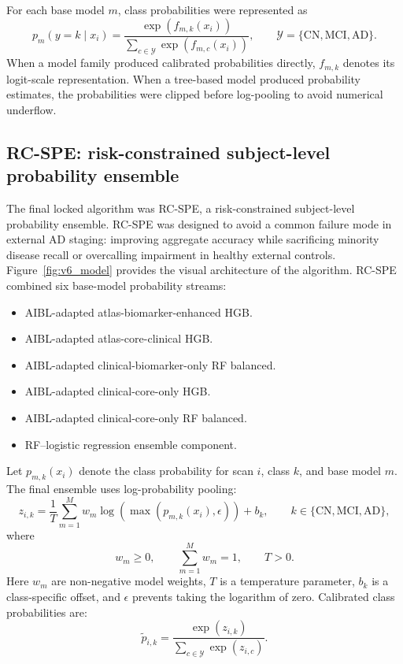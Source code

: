 For each base model $m$, class probabilities were represented as
\begin{equation}
p_m(y=k\mid x_i)=
\frac{\exp(f_{m,k}(x_i))}
{\sum_{c\in\mathcal{Y}}\exp(f_{m,c}(x_i))},
\qquad
\mathcal{Y}=\{\mathrm{CN},\mathrm{MCI},\mathrm{AD}\}.
\label{eq:base_prob}
\end{equation}
When a model family produced calibrated probabilities directly, $f_{m,k}$ denotes its logit-scale representation. When a tree-based model produced probability estimates, the probabilities were clipped before log-pooling to avoid numerical underflow.

\subsection{RC-SPE: risk-constrained subject-level probability ensemble}
\label{sec:model}

The final locked algorithm was RC-SPE, a risk-constrained subject-level probability ensemble. RC-SPE was designed to avoid a common failure mode in external AD staging: improving aggregate accuracy while sacrificing minority disease recall or overcalling impairment in healthy external controls. Figure~\ref{fig:v6_model} provides the visual architecture of the algorithm. RC-SPE combined six base-model probability streams:
\begin{itemize}[leftmargin=*,itemsep=2pt]
    \item AIBL-adapted atlas-biomarker-enhanced HGB.
    \item AIBL-adapted atlas-core-clinical HGB.
    \item AIBL-adapted clinical-biomarker-only RF balanced.
    \item AIBL-adapted clinical-core-only HGB.
    \item AIBL-adapted clinical-core-only RF balanced.
    \item RF--logistic regression ensemble component.
\end{itemize}

Let $p_{m,k}(x_i)$ denote the class probability for scan $i$, class $k$, and base model $m$. The final ensemble uses log-probability pooling:
\begin{equation}
z_{i,k} =
\frac{1}{T}\sum_{m=1}^{M} w_m
\log\left(\max(p_{m,k}(x_i), \epsilon)\right) + b_k ,
\qquad
k \in \{\mathrm{CN},\mathrm{MCI},\mathrm{AD}\},
\label{eq:v6_log_pool}
\end{equation}
where
\begin{equation}
w_m \geq 0,\qquad \sum_{m=1}^{M}w_m=1,\qquad T>0.
\label{eq:ensemble_constraints}
\end{equation}
Here $w_m$ are non-negative model weights, $T$ is a temperature parameter, $b_k$ is a class-specific offset, and $\epsilon$ prevents taking the logarithm of zero. Calibrated class probabilities are:
\begin{equation}
\tilde{p}_{i,k} =
\frac{\exp(z_{i,k})}
{\sum_{c\in\mathcal{Y}}\exp(z_{i,c})}.
\label{eq:v6_softmax}
\end{equation}

